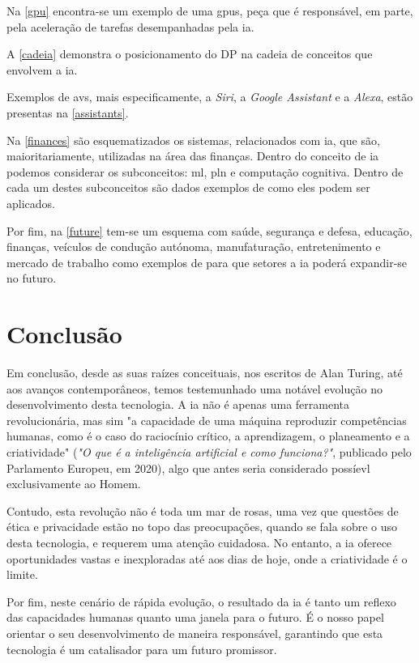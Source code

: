 \documentclass{report}
\begin{document}
	Na \autoref{gpu} encontra-se um exemplo de uma \ac{gpus}, peça que é responsável, em parte, pela aceleração de tarefas desempanhadas pela \ac{ia}.
	
	A \autoref{cadeia} demonstra o posicionamento do DP na cadeia de conceitos que envolvem a \ac{ia}.
	
	Exemplos de \ac{avs}, mais especificamente, a \textit{Siri}, a \textit{Google Assistant} e a \textit{Alexa}, estão presentas na \autoref{assistants}.
	
	Na \autoref{finances} são esquematizados os sistemas, relacionados com \ac{ia}, que são, maioritariamente, utilizadas na área das finanças. Dentro do conceito de \ac{ia} podemos considerar os subconceitos: \ac{ml}, \ac{pln} e computação cognitiva. Dentro de cada um destes subconceitos são dados exemplos de como eles podem ser aplicados.
	
	Por fim, na \autoref{future} tem-se um esquema com saúde, segurança e defesa, educação, finanças, veículos de condução autónoma, manufaturação, entretenimento e mercado de trabalho como exemplos de para que setores a \ac{ia} poderá expandir-se no futuro.

\chapter{Conclusão}
\label{chap.conclusao}
	Em conclusão, desde as suas raízes conceituais, nos escritos de Alan Turing, até aos avanços contemporâneos, temos testemunhado uma notável evolução no desenvolvimento desta tecnologia. A \ac{ia} não é apenas uma ferramenta revolucionária, mas sim "a capacidade de uma máquina reproduzir competências humanas, como é o caso do raciocínio crítico, a aprendizagem, o planeamento e a criatividade" (\textit{"O que é a inteligência artificial e como funciona?"}, publicado pelo Parlamento Europeu, em 2020), algo que antes seria considerado possíevl exclusivamente ao Homem.
	
	Contudo, esta revolução não é toda um mar de rosas, uma vez que questões de ética e privacidade estão no topo das preocupações, quando se fala sobre o uso desta
tecnologia, e requerem uma atenção cuidadosa. No entanto, a \ac{ia} oferece
oportunidades vastas e inexploradas até aos dias de hoje, onde a criatividade é
o limite. \cite{lei}

	Por fim, neste cenário de rápida evolução, o resultado da \ac{ia} é tanto um reflexo das capacidades humanas quanto uma janela para o futuro. É o nosso papel
orientar o seu desenvolvimento de maneira responsável, garantindo que esta
tecnologia é um catalisador para um futuro promissor.
\end{document}
